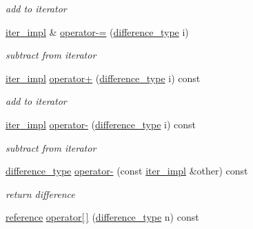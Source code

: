 \begin{DoxyCompactItemize}
\begin{DoxyCompactList}\small\item\em add to iterator \end{DoxyCompactList}\item 
\mbox{\hyperlink{classnlohmann_1_1detail_1_1iter__impl}{iter\+\_\+impl}} \& \mbox{\hyperlink{classnlohmann_1_1detail_1_1iter__impl_abcc9d51bc52f2e8483bbe4018f05e978}{operator-\/=}} (\mbox{\hyperlink{classnlohmann_1_1detail_1_1iter__impl_a2f7ea9f7022850809c60fc3263775840}{difference\+\_\+type}} i)
\begin{DoxyCompactList}\small\item\em subtract from iterator \end{DoxyCompactList}\item 
\mbox{\hyperlink{classnlohmann_1_1detail_1_1iter__impl}{iter\+\_\+impl}} \mbox{\hyperlink{classnlohmann_1_1detail_1_1iter__impl_a8ef76aeb5a5032768f0f61f48ac189c0}{operator+}} (\mbox{\hyperlink{classnlohmann_1_1detail_1_1iter__impl_a2f7ea9f7022850809c60fc3263775840}{difference\+\_\+type}} i) const
\begin{DoxyCompactList}\small\item\em add to iterator \end{DoxyCompactList}\item 
\mbox{\hyperlink{classnlohmann_1_1detail_1_1iter__impl}{iter\+\_\+impl}} \mbox{\hyperlink{classnlohmann_1_1detail_1_1iter__impl_a0dd9c415b94a02ff2aa25da75e52da30}{operator-\/}} (\mbox{\hyperlink{classnlohmann_1_1detail_1_1iter__impl_a2f7ea9f7022850809c60fc3263775840}{difference\+\_\+type}} i) const
\begin{DoxyCompactList}\small\item\em subtract from iterator \end{DoxyCompactList}\item 
\mbox{\hyperlink{classnlohmann_1_1detail_1_1iter__impl_a2f7ea9f7022850809c60fc3263775840}{difference\+\_\+type}} \mbox{\hyperlink{classnlohmann_1_1detail_1_1iter__impl_a49bf3e708a9c1c88c415011735962d06}{operator-\/}} (const \mbox{\hyperlink{classnlohmann_1_1detail_1_1iter__impl}{iter\+\_\+impl}} \&other) const
\begin{DoxyCompactList}\small\item\em return difference \end{DoxyCompactList}\item 
\mbox{\hyperlink{classnlohmann_1_1detail_1_1iter__impl_a5be8001be099c6b82310f4d387b953ce}{reference}} \mbox{\hyperlink{classnlohmann_1_1detail_1_1iter__impl_ac0b9276f1102ed4b9cd3f5f56287e3ce}{operator\mbox{[}$\,$\mbox{]}}} (\mbox{\hyperlink{classnlohmann_1_1detail_1_1iter__impl_a2f7ea9f7022850809c60fc3263775840}{difference\+\_\+type}} n) const

\end{DoxyCompactItemize}
